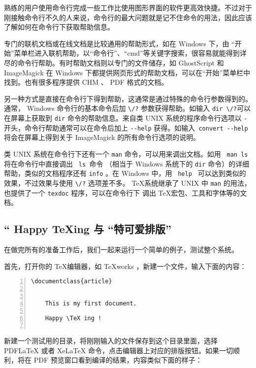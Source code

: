 {
    \qquad 熟练的用户使用命令行完成一些工作比使用图形界面的软件更高效快捷。不过对于刚接触命令行不久的人来说，命令行的最大问题就是记不住命令的用法，因此应该了解如何在命令行下获取帮助信息。

    \qquad 专门的联机文档或在线文档是比较通用的帮助形式，如在 Windows 下，由 “开始”菜单栏进入联机帮助，以“命令行”、“cmd”等关键字搜索，很容易就能得到详尽的命令行帮助。有时帮助文档则以专门的文件储存，如 GhostScript 和 ImageMagick 在 Windows 下都提供网页形式的帮助文档，可以在“开始”菜单栏中找到。也有很多程序提供 CHM 、 PDF 格式的文档。

    \qquad 另一种方式是直接在命令行下得到帮助，这通常是通过特殊的命令行参数得到的。通常， Windows 命令行的基本命令后加 \lstinline{\/?} 参数获得帮助。如输入 \lstinline{dir \/?}可以在屏幕上获取到 \lstinline{dir} 命令的帮助信息。来自类 UNIX 系统的程序命令行选项以 \lstinline{-}开头，命令行帮助通常可以在命令后加上 \lstinline{--help} 获得。如输入\lstinline{ convert --help } 将会在屏幕上得到关于 ImageMagick 的所有命令行选项的说明。

    \qquad 类 UNIX 系统在命令行下还有一个 \lstinline{man} 命令，可以用来调出文档。如用 \lstinline{ man ls } 将在命令行中直接调出 \lstinline{ ls }命令 （相当于 Windows 系统下的 \lstinline{dir} 命令）的详细帮助，类似的文档程序还有 \lstinline{info} 。在 Windows 中，用 \lstinline{ help } 可以达到类似的效果，不过效果与使用  \lstinline{\/?}  选项差不多。 \TeX 系统继承了 UNIX 中 \lstinline{man} 的用法，也提供了一个 \lstinline{texdoc} 程序，可以在命令行下 调出 \TeX 宏包、工具和字体等的文档。
}

\subsection{“ Happy \TeX ing 与 “特可爱排版”}

在做完所有的准备工作后，我们一起来运行一个简单的例子，测试整个系统。

首先，打开你的 \TeX 编辑器，如 TeXworks ，新建一个文件，输入下面的内容：
\begin{lstlisting}[numbers=left]
    \documentclass{article}

    
    This is my first document.

    Happy \TeX ing !
    
\end{lstlisting}

新建一个测试用的目录，将刚刚输入的文件保存到这个目录里面，选择 PDFLaTeX 或者 XeLaTeX 命令，点击编辑器上对应的排版按钮。如果一切顺利，将在 PDF 预览窗口看到编译的结果，内容类似下面的样子：

